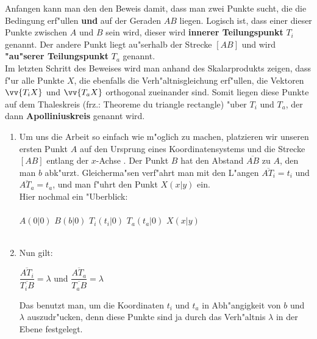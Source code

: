 \begin{Beweis}
  Anfangen kann man den den Beweis damit, dass man zwei Punkte sucht, die die Bedingung erf"ullen \textbf{und} auf der Geraden $AB$ liegen. Logisch ist, dass einer dieser Punkte zwischen $A$ und $B$ sein wird, dieser wird \textbf{innerer Teilungspunkt} $T_{i}$ genannt. Der andere Punkt liegt au"serhalb der Strecke $[AB]$ und wird \textbf{"au"serer Teilungspunkt} $T_{a}$ genannt. \\
  Im letzten Schritt des Beweises wird man anhand des Skalarprodukts zeigen, dass f"ur alle Punkte $X$, die ebenfalls die Verh"altnisgleichung erf"ullen, die Vektoren $\vv{T_{i}X}$ und $\vv{T_{a}X}$ orthogonal zueinander sind. Somit liegen diese Punkte auf dem Thaleskreis (frz.: Theoreme du triangle rectangle) "uber $T_{i}$ und $T_{a}$, der dann \textbf{Apolliniuskreis} genannt wird.\\
  \begin{enumerate}


  \item {Um uns die Arbeit so einfach wie m"oglich zu machen, platzieren wir unseren ersten Punkt $A$ auf den Ursprung eines Koordinatensystems und die Strecke $[AB]$ entlang der $x$-Achse . Der Punkt $B$ hat den Abstand $\overline{AB}$ zu $A$, den man $b$ abk"urzt. Gleicherma"sen verf"ahrt man mit den L"angen $\overline{AT_{i}}=t_{i}$ und $\overline{AT_{a}}= t_{a}$, und man f"uhrt den Punkt $X(x|y)$ ein.\\
  Hier nochmal ein "Uberblick:\\
  \\
  \vartriangleright $A(0|0)$ \qquad \vartriangleright $B(b|0)$ \qquad \vartriangleright $T_{i}(t_{i}|0)$ \qquad \vartriangleright $T_{a}(t_{a}|0)$ \qquad \vartriangleright $X(x|y)$\\
  \\}

  \item {Nun gilt:
  \begin{center}
  $\dfrac{\overline{AT_{i}}}{\overline{T_{i}B}} = \lambda$ \qquad und \qquad $\dfrac{\overline{AT_{a}}}{\overline{T_{a}B}} = \lambda$ \\
  \end{center}
  Das benutzt man, um die Koordinaten $t_{i}$ und $t_{a}$ in Abh"angigkeit von $b$ und $\lambda$ auszudr"ucken, denn diese Punkte sind ja durch das Verh"altnis $\lambda$ in der Ebene festgelegt.\\

}
\end{enumerate}
\end{Beweis}
